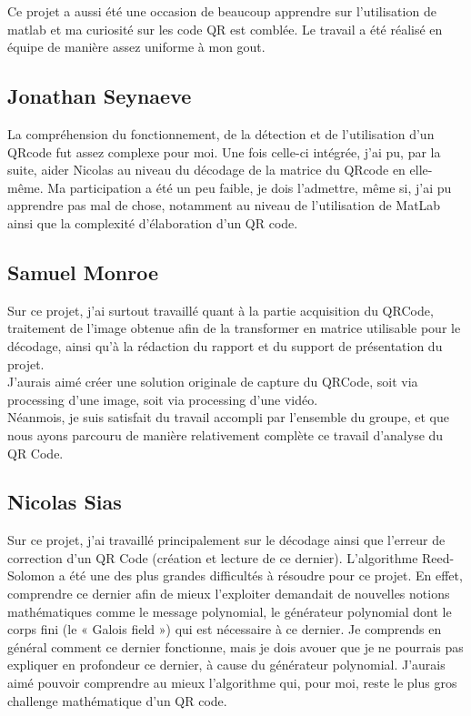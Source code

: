\documentclass{report}
\begin{document}
		    Ce projet a aussi été une occasion de beaucoup apprendre sur l'utilisation de matlab et ma curiosité sur les code QR est comblée.  Le travail a été réalisé en équipe de manière assez uniforme à mon gout.\\

		\subsection{Jonathan Seynaeve}

			La compréhension du fonctionnement, de la détection et de l'utilisation d'un QRcode fut assez complexe pour moi. Une fois celle-ci intégrée, j'ai pu, par la suite, aider Nicolas au niveau du décodage de la matrice du QRcode en elle-même. Ma participation a été un peu faible, je dois l'admettre, même si, j'ai pu apprendre pas mal de chose, notamment au niveau de l'utilisation de MatLab ainsi que la complexité d'élaboration d'un QR code.\\
		
		\subsection{Samuel Monroe}

			Sur ce projet, j'ai surtout travaillé quant à la partie acquisition du QRCode, traitement de l'image obtenue afin de la transformer en matrice utilisable pour le décodage, ainsi qu'à la rédaction du rapport et du support de présentation du projet.\\

			J'aurais aimé créer une solution originale de capture du QRCode, soit via processing d'une image, soit via processing d'une vidéo.\\
			Néanmois, je suis satisfait du travail accompli par l'ensemble du groupe, et que nous ayons parcouru de manière relativement complète ce travail d'analyse du QR Code.\\

		\subsection{Nicolas Sias}
		
		    Sur ce projet, j’ai travaillé principalement sur le décodage ainsi que l’erreur de correction d’un QR Code (création et lecture de ce dernier). L’algorithme Reed-Solomon a été une des plus grandes difficultés à résoudre pour ce projet. En effet, comprendre ce dernier afin de mieux l’exploiter demandait de nouvelles notions mathématiques comme le message polynomial, le générateur polynomial dont le corps fini (le « Galois field ») qui est nécessaire à ce dernier. Je comprends en général comment ce dernier fonctionne, mais je dois avouer que je ne pourrais pas expliquer en profondeur ce dernier, à cause du générateur polynomial. J’aurais aimé pouvoir comprendre au mieux l’algorithme qui, pour moi, reste le plus gros challenge mathématique d’un QR code.
\end{document}
